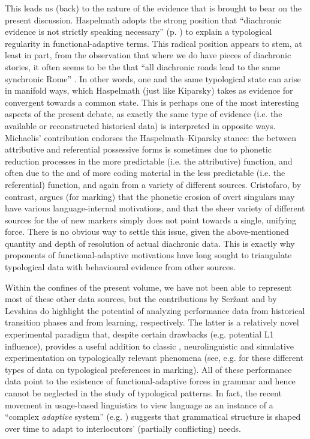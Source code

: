 \documentclass[output=paper]{langsci/langscibook}
\begin{document}
\newpage 
\largerpage
This leads us (back) to the nature of the evidence that is brought to bear on the present discussion. Haspelmath adopts the strong position that “diachronic evidence is not strictly speaking necessary” (p. \pageref{p:haspelmath:strictlyspeakingnecessary}) to explain a typological regularity in functional-adaptive terms. This radical position appears to stem, at least in part, from the observation that where we do have pieces of diachronic stories, it often seems to be the  that “all diachronic roads lead to the same synchronic Rome” \citep[38]{Kiparsky2008}. In other words, one and the same typological state can arise in manifold ways, which Haspelmath (just like Kiparsky) takes as evidence for convergent  towards a common  state. This is perhaps one of the most interesting aspects of the present debate, as exactly the same type of evidence (i.e. the available or reconstructed historical data) is interpreted in opposite ways. Michaelis’ contribution endorses the Haspelmath–Kiparsky stance: the  between attributive and referential possessive forms is sometimes due to phonetic reduction processes in the more predictable (i.e. the attributive) function, and often due to the  and  of more coding material in the less predictable (i.e. the referential) function, and again from a variety of different sources. Cristofaro, by contrast, argues (for  marking) that the phonetic erosion of overt singulars may have various language-internal motivations, and that the sheer variety of different sources for the  of new  markers simply does not point towards a single, unifying force. There is no obvious way to settle this issue, given the above-mentioned quantity and depth of resolution of actual diachronic data. This is exactly why proponents of functional-adaptive motivations have long sought to triangulate typological data with behavioural evidence from other sources.

Within the confines of the present volume, we have not been able to represent most of these other data sources, but the contributions by Seržant and by Levshina do highlight the potential of analyzing performance data from historical transition phases and from  learning, respectively. The latter is a relatively novel experimental paradigm that, despite certain drawbacks (e.g. potential L1 influence), provides a useful addition to classic , neurolinguistic and simulative experimentation on typologically relevant phenomena (see, e.g. \citealt{KurumadaJaeger2015,BickelEtAl2015,Lestrade2018} for these different types of data on typological preferences in  marking). All of these performance data point to the existence of functional-adaptive forces in grammar and hence cannot be neglected in the study of typological patterns. In fact, the recent movement in usage-based linguistics to view language as an instance of a “complex \textit{adaptive} system” (e.g. \citealt{Gell-Mann1992,BecknerEtAl2009}) suggests that grammatical structure is shaped over time to adapt to interlocutors’ (partially conflicting) needs. 
\end{document}
